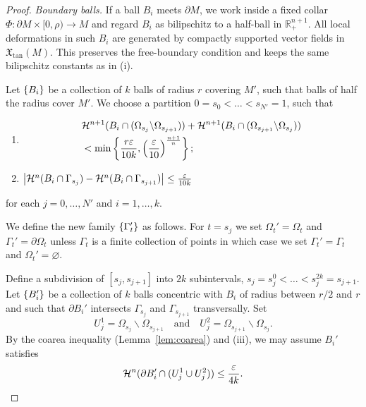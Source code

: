 \begin{lemma}
\begin{proof}
        \noindent\emph{Boundary balls.}
        If a ball $B_i$ meets $\partial M$, we work inside a fixed collar
        $\Phi:\partial M\times[0,\rho)\to M$ and regard $B_i$ as bilipschitz to a half-ball
        in $\mathbb R^{n+1}_+$. All
        local deformations in such $B_i$ are generated by compactly
        supported vector fields in $\mathfrak{X}_{\mathrm{tan}}(M)$.
        This preserves the free-boundary condition and keeps the same
        bilipschitz constants as in (i).

        Let $\left\{B_i\right\}$ be a collection of $k$ balls of radius $r$ covering $M'$, such that balls of half the radius cover $M'$. We choose a partition $0 = s_0 < \dots < s_{N'} = 1$, such that
        \begin{enumerate}
            \item[(iii)] \begin{align*}
            &\mathcal{H}^{n + 1}(B_i\cap(\Omega_{s_j}\backslash\Omega_{s_{j + 1}})) + \mathcal{H}^{n + 1}(B_i\cap(\Omega_{s_{j + 1}}\backslash\Omega_{s_j})) \\
            &< \min\left\{\frac{r\varepsilon}{10k}, \left(\frac{\varepsilon}{10}\right)^{\frac{n + 1}{n}}\right\};
            \end{align*}
            \item[(iv)] $\left| \mathcal{H}^n(B_i\cap \Gamma_{s_j}) - \mathcal{H}^n(B_i\cap \Gamma_{s_{j + 1}}) \right| \leq \frac{\varepsilon}{10k}$
        \end{enumerate}
        for each $j = 0, \dots, N'$ and $i = 1, \dots, k$.

        We define the new family $\left\{\Gamma_t'\right\}$ as follows. For $t = s_j$ we set $\Omega_t' = \Omega_t$ and $\Gamma_t' = \partial\Omega_t$ unless $\Gamma_t$ is a finite collection of points in which case we set $\Gamma_t' = \Gamma_t$ and $\Omega_t' = \varnothing$.

        Define a subdivision of $[s_j, s_{j + 1}]$ into $2k$ subintervals, $s_j = s_j^0 < \dots < s_j^{2k} = s_{j + 1}$. Let $\left\{B_i'\right\}$ be a collection of $k$ balls concentric with $B_i$ of radius between $r/2$ and $r$ and such that $\partial B_i'$ intersects $\Gamma_{s_j}$ and $\Gamma_{s_{j + 1}}$ transversally. Set
        \begin{equation*}
            U_j^1 = \Omega_{s_j}\backslash\Omega_{s_{j + 1}}\quad\text{and}\quad U_j^2 = \Omega_{s_{j + 1}}\backslash\Omega_{s_j}.
        \end{equation*}
        By the coarea inequality (Lemma~\ref{lem:coarea}) and (iii), we may assume $B_i'$ satisfies
        \begin{equation}\label{eq:coarea-small-boundary-ball}
            \mathcal{H}^n(\partial B_i'\cap (U_j^1\cup U_j^2)) \leq \frac{\varepsilon}{4k}.
        \end{equation}


\end{proof}
\end{lemma}
